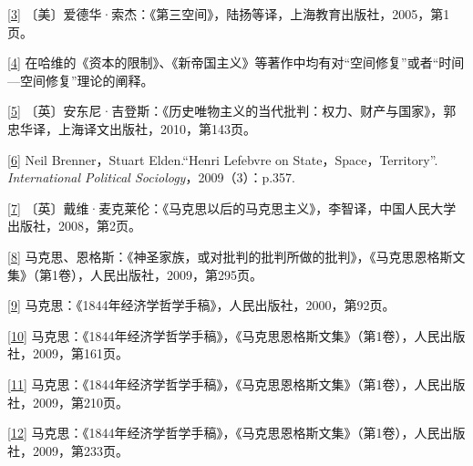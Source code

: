 \documentclass[UTF8, fontset = sourcesans, a4paper, oneside, zihao =
-4, scheme=chinese, no-math, space=true]{ctexbook}
\begin{document}
\protect\hypertarget{part0010_split_002.htmlux5cux23m3}{}{}\protect\hyperlink{part0010_split_001.htmlux5cux23w3}{{[}3{]}}
〔美〕爱德华·索杰：《第三空间》，陆扬等译，上海教育出版社，2005，第1页。

\protect\hypertarget{part0010_split_002.htmlux5cux23m4}{}{}\protect\hyperlink{part0010_split_001.htmlux5cux23w4}{{[}4{]}}
在哈维的《资本的限制》、《新帝国主义》等著作中均有对``空间修复''或者``时间---空间修复''理论的阐释。

\protect\hypertarget{part0010_split_002.htmlux5cux23m5}{}{}\protect\hyperlink{part0010_split_001.htmlux5cux23w5}{{[}5{]}}
〔英〕安东尼·吉登斯：《历史唯物主义的当代批判：权力、财产与国家》，郭忠华译，上海译文出版社，2010，第143页。

\protect\hypertarget{part0010_split_002.htmlux5cux23m6}{}{}\protect\hyperlink{part0010_split_001.htmlux5cux23w6}{{[}6{]}}
Neil Brenner，Stuart Elden.``Henri Lefebvre on
State，Space，Territory''. \emph{International Political
Sociology}，2009（3）：p.357.

\protect\hypertarget{part0010_split_002.htmlux5cux23m7}{}{}\protect\hyperlink{part0010_split_002.htmlux5cux23w7}{{[}7{]}}
〔英〕戴维·麦克莱伦：《马克思以后的马克思主义》，李智译，中国人民大学出版社，2008，第2页。

\protect\hypertarget{part0010_split_002.htmlux5cux23m8}{}{}\protect\hyperlink{part0010_split_002.htmlux5cux23w8}{{[}8{]}}
马克思、恩格斯：《神圣家族，或对批判的批判所做的批判》，《马克思恩格斯文集》（第1卷），人民出版社，2009，第295页。

\protect\hypertarget{part0010_split_002.htmlux5cux23m9}{}{}\protect\hyperlink{part0010_split_002.htmlux5cux23w9}{{[}9{]}}
马克思：《1844年经济学哲学手稿》，人民出版社，2000，第92页。

\protect\hypertarget{part0010_split_002.htmlux5cux23m10}{}{}\protect\hyperlink{part0010_split_002.htmlux5cux23w10}{{[}10{]}}
马克思：《1844年经济学哲学手稿》，《马克思恩格斯文集》（第1卷），人民出版社，2009，第161页。

\protect\hypertarget{part0010_split_002.htmlux5cux23m11}{}{}\protect\hyperlink{part0010_split_002.htmlux5cux23w11}{{[}11{]}}
马克思：《1844年经济学哲学手稿》，《马克思恩格斯文集》（第1卷），人民出版社，2009，第210页。

\protect\hypertarget{part0010_split_002.htmlux5cux23m12}{}{}\protect\hyperlink{part0010_split_002.htmlux5cux23w12}{{[}12{]}}
马克思：《1844年经济学哲学手稿》，《马克思恩格斯文集》（第1卷），人民出版社，2009，第233页。
\end{document}
